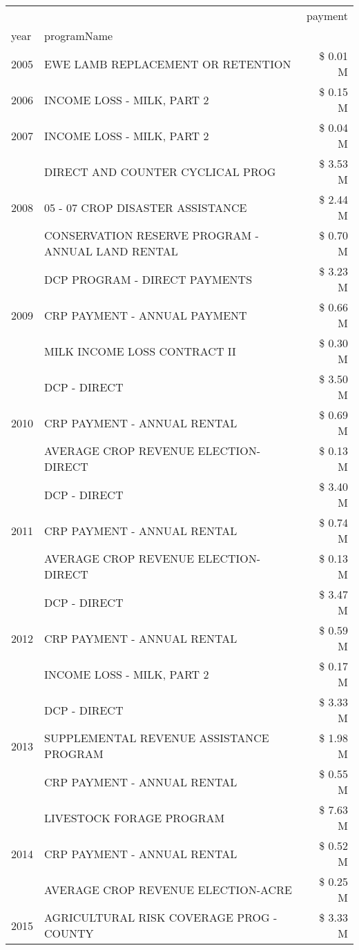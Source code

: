 \begin{tabular}{llr}
\toprule
 &  & payment \\
year & programName &  \\
\midrule
2005 & EWE LAMB REPLACEMENT OR RETENTION & \$ 0.01 M \\
\cline{1-3}
2006 & INCOME LOSS - MILK, PART 2 & \$ 0.15 M \\
\cline{1-3}
2007 & INCOME LOSS - MILK, PART 2 & \$ 0.04 M \\
\cline{1-3}
\multirow[t]{3}{*}{2008} & DIRECT AND COUNTER CYCLICAL PROG & \$ 3.53 M \\
 & 05 - 07 CROP DISASTER ASSISTANCE & \$ 2.44 M \\
 & CONSERVATION RESERVE PROGRAM - ANNUAL LAND RENTAL & \$ 0.70 M \\
\cline{1-3}
\multirow[t]{3}{*}{2009} & DCP PROGRAM - DIRECT PAYMENTS & \$ 3.23 M \\
 & CRP PAYMENT - ANNUAL PAYMENT & \$ 0.66 M \\
 & MILK INCOME LOSS CONTRACT II & \$ 0.30 M \\
\cline{1-3}
\multirow[t]{3}{*}{2010} & DCP - DIRECT & \$ 3.50 M \\
 & CRP PAYMENT - ANNUAL RENTAL & \$ 0.69 M \\
 & AVERAGE CROP REVENUE ELECTION-DIRECT & \$ 0.13 M \\
\cline{1-3}
\multirow[t]{3}{*}{2011} & DCP - DIRECT & \$ 3.40 M \\
 & CRP PAYMENT - ANNUAL RENTAL & \$ 0.74 M \\
 & AVERAGE CROP REVENUE ELECTION-DIRECT & \$ 0.13 M \\
\cline{1-3}
\multirow[t]{3}{*}{2012} & DCP - DIRECT & \$ 3.47 M \\
 & CRP PAYMENT - ANNUAL RENTAL & \$ 0.59 M \\
 & INCOME LOSS - MILK, PART 2 & \$ 0.17 M \\
\cline{1-3}
\multirow[t]{3}{*}{2013} & DCP - DIRECT & \$ 3.33 M \\
 & SUPPLEMENTAL REVENUE ASSISTANCE PROGRAM & \$ 1.98 M \\
 & CRP PAYMENT - ANNUAL RENTAL & \$ 0.55 M \\
\cline{1-3}
\multirow[t]{3}{*}{2014} & LIVESTOCK FORAGE PROGRAM & \$ 7.63 M \\
 & CRP PAYMENT - ANNUAL RENTAL & \$ 0.52 M \\
 & AVERAGE CROP REVENUE ELECTION-ACRE & \$ 0.25 M \\
\cline{1-3}
\multirow[t]{3}{*}{2015} & AGRICULTURAL RISK COVERAGE PROG - COUNTY & \$ 3.33 M \\

\end{tabular}
